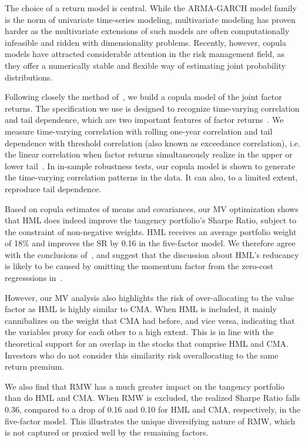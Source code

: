 The choice of a return model is central. While the ARMA-GARCH model family is the norm of univariate time-series modeling, multivariate modeling has proven harder as the multivariate extensions of such models are often computationally infeasible and ridden with dimensionality problems. Recently, however, copula models have attracted considerable attention in the risk management field, as they offer a numerically stable and flexible way of estimating joint probability distributions. 

Following closely the method of~\textcite{ChristoffersenLanglois2013}, we build a copula model of the joint factor returns. The specification we use is designed to recognize time-varying correlation and tail dependence, which are two important features of factor returns~\autocite{ChristoffersenLanglois2013}. We measure time-varying correlation with rolling one-year correlation and tail dependence with threshold correlation (also known as exceedance correlation), i.e. the linear correlation when factor returns simultaneously realize in the upper or lower tail~\autocite{AngChen2002}. In in-sample robustness tests, our copula model is shown to generate the time-varying correlation patterns in the data. It can also, to a limited extent, reproduce tail dependence.

Based on copula estimates of means and covariances, our MV optimization shows that HML does indeed improve the tangency portfolio's Sharpe Ratio, subject to the constraint of non-negative weights. HML receives an average portfolio weight of 18\% and improves the SR by 0.16 in the five-factor model. We therefore agree with the conclusions of~\textcite{Asness2015}, and suggest that the discussion about HML's reducancy is likely to be caused by omitting the momentum factor from the zero-cost regresssions in~\textcite{FF2015}.

However, our MV analysis also highlights the risk of over-allocating to the value factor as HML is highly similar to CMA. When HML is included, it mainly cannibalizes on the weight that CMA had before, and vice versa, indicating that the variables proxy for each other to a high extent. This is in line with the theoretical support for an overlap in the stocks that comprise HML and CMA. Investors who do not consider this similarity risk overallocating to the same return premium.

We also find that RMW has a much greater impact on the tangency portfolio than do HML and CMA. When RMW is excluded, the realized Sharpe Ratio falls 0.36, compared to a drop of 0.16 and 0.10 for HML and CMA, respectively, in the five-factor model. This illustrates the unique diversifying nature of RMW, which is not captured or proxied well by the remaining factors.

